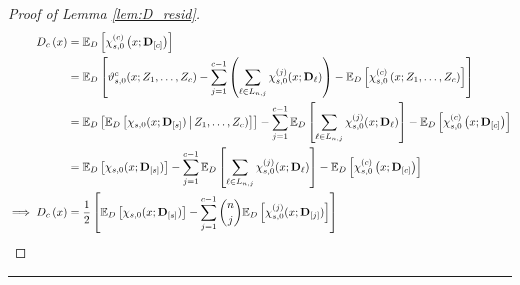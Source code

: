 \begin{proof}[Proof of Lemma \ref{lem:D_resid}]
    \begin{equation}
        \begin{aligned}
            D_{c}\left(x\right)
            & = \mathbb{E}_{D}\left[\chi_{s,0}^{(c)}\left(x; \mathbf{D}_{[c]}\right)\right] \\
            & = \mathbb{E}_{D}\left[ \vartheta_{s,0}^{c}(x; Z_{1}, \dotsc, Z_{c}) 
        - \sum_{j = 1}^{c-1}\left(\sum_{\ell \in L_{n,j}} \chi_{s,0}^{(j)}(x; \mathbf{D}_{\ell})\right) 
        - \mathbb{E}_{D}\left[\chi_{s,0}^{(c)}\left(x; Z_{1}, \dotsc, Z_{c}\right)\right]\right] \\
        & = \mathbb{E}_{D}\left[\mathbb{E}_{D}\left[\chi_{s,0}(x; \mathbf{D}_{[s]}) \,\middle| \,  Z_{1}, \dotsc, Z_{c})\right]\right]
        - \sum_{j = 1}^{c - 1}\mathbb{E}_{D}\left[\sum_{\ell \in L_{n,j}} \chi_{s,0}^{(j)}(x; \mathbf{D}_{\ell})\right]
        - \mathbb{E}_{D}\left[\chi_{s,0}^{(c)}\left(x; \mathbf{D}_{[c]}\right)\right] \\
        & = \mathbb{E}_{D}\left[\chi_{s,0}(x; \mathbf{D}_{[s]}) \right]
        - \sum_{j = 1}^{c - 1}\mathbb{E}_{D}\left[\sum_{\ell \in L_{n,j}} \chi_{s,0}^{(j)}(x; \mathbf{D}_{\ell})\right]
        - \mathbb{E}_{D}\left[\chi_{s,0}^{(c)}\left(x; \mathbf{D}_{[c]}\right)\right] \\
        \implies D_{c}\left(x\right) 
        & = \frac{1}{2} \left[\mathbb{E}_{D}\left[\chi_{s,0}(x; \mathbf{D}_{[s]}) \right] - \sum_{j = 1}^{c - 1}\binom{n}{j}\mathbb{E}_{D}\left[\chi_{s,0}^{(j)}(x; \mathbf{D}_{[j]})\right]\right]
        \end{aligned}
    \end{equation}
\end{proof}

\hrule

